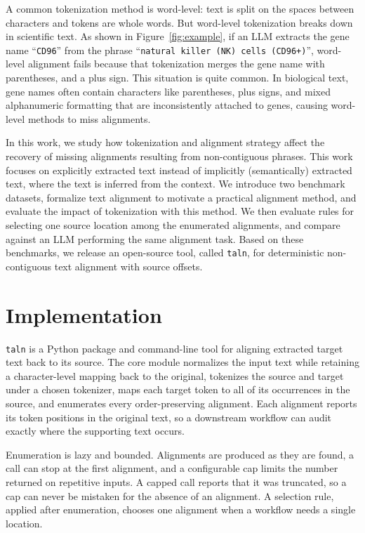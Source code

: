\documentclass[pdflatex,lineno,referee,sn-vancouver-num]{sn-jnl}
\theoremstyle{thmstyleone}
\theoremstyle{thmstylethree}
\theoremstyle{thmstyletwo}
\begin{document}
A common tokenization method is word-level: text is split on the spaces between characters and tokens are whole words. But word-level tokenization breaks down in scientific text. As shown in Figure~\ref{fig:example}, if an LLM extracts the gene name ``\texttt{CD96}'' from the phrase ``\texttt{natural killer (NK) cells (CD96+)}'', word-level alignment fails because that tokenization merges the gene name with parentheses, and a plus sign. This situation is quite common. In biological text, gene names often contain characters like parentheses, plus signs, and mixed alphanumeric formatting that are inconsistently attached to genes, causing word-level methods to miss alignments.

In this work, we study how tokenization and alignment strategy affect the recovery of missing alignments resulting from non-contiguous phrases. This work focuses on explicitly extracted text instead of implicitly (semantically) extracted text, where the text is inferred from the context. We introduce two benchmark datasets, formalize text alignment to motivate a practical alignment method, and evaluate the impact of tokenization with this method. We then evaluate rules for selecting one source location among the enumerated alignments, and compare against an LLM performing the same alignment task. Based on these benchmarks, we release an open-source tool, called \texttt{taln}, for deterministic non-contiguous text alignment with source offsets.

\section{Implementation}
\texttt{taln} is a Python package and command-line tool for aligning extracted target text back to its source. The core module normalizes the input text while retaining a character-level mapping back to the original, tokenizes the source and target under a chosen tokenizer, maps each target token to all of its occurrences in the source, and enumerates every order-preserving alignment. Each alignment reports its token positions in the original text, so a downstream workflow can audit exactly where the supporting text occurs.

Enumeration is lazy and bounded. Alignments are produced as they are found, a call can stop at the first alignment, and a configurable cap limits the number returned on repetitive inputs. A capped call reports that it was truncated, so a cap can never be mistaken for the absence of an alignment. A selection rule, applied after enumeration, chooses one alignment when a workflow needs a single location.
\end{document}
